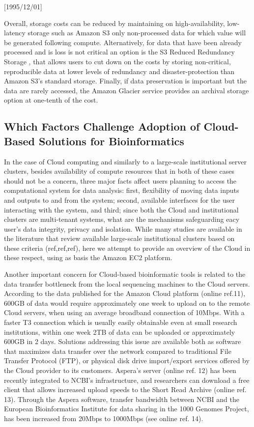 \NeedsTeXFormat{LaTeX2e}[1995/12/01] \documentclass[10pt]{bmc_article}
\newenvironment{bmcformat}{\begin{raggedright}\baselineskip20pt\sloppy\setboolean{publ}{false}}{\end{raggedright}\baselineskip20pt\sloppy}
\begin{document}
\begin{bmcformat}
Overall, storage costs can be reduced by maintaining on high-availability, low-latency storage such as Amazon S3 only non-processed 
data for which value will be generated following compute. Alternatively, for data that have been already processed and is loss is not 
critical an option is the S3 Reduced Redundancy Storage \cite{reduced}, that allows users to cut down on the costs  by storing 
non-critical, reproducible data at lower levels of redundancy and disaster-protection than Amazon S3’s standard storage. Finally, if 
data preservation is important but the data are rarely accessed, the Amazon Glacier service \cite{glacier} provides an archival storage
option at one-tenth of the cost. \pb

\subsection*{Which Factors Challenge Adoption of Cloud-Based Solutions for Bioinformatics }

In the case of Cloud computing and similarly to a large-scale institutional server clusters, besides availability of 
compute resources that in both of these cases should not be a concern, three major facts affect users planning 
to access  the computational system for data analysis: first, flexibility of moving data inputs and outputs to and 
from the system; second, available interfaces for the user interacting with the system, and third; since both the 
Cloud and institutional clusters are multi-tenant systems, what are the mechanisms safeguarding eacy user's data
integrity, privacy and isolation. While many studies are available in the literature that review available large-scale 
institutional clusters based on these criteria (ref,ref,ref), here we attempt to provide an overview of the Cloud
in these respect, using as basis the Amazon EC2 platform.
 
Another important concern for Cloud-based bioinformatic tools is related to the data transfer bottleneck from
the local sequencing machines to the Cloud servers.  According to the data published for the Amazon Cloud
platform (online ref.11), 600GB of data would require approximately one week to upload on to the remote Cloud
servers, when using an average broadband connection of 10Mbps. With a faster T3 connection which is usually
easily obtainable even at small research institutions, within one week 2TB of data can be uploaded or
approximately 600GB in 2 days.  Solutions addressing this issue are available both as software that maximizes
data transfer over the network compared to traditional File Transfer Protocol (FTP), or physical disk drive
import/export services offered by the Cloud provider to its customers. Aspera's server (online ref. 12) has
been recently integrated to NCBI's infrastructure, and researchers can download a free client that allows
increased upload speeds to the Short Read Archive (online ref. 13).  Through the Aspera software, transfer
bandwidth between NCBI and the European Bioinformatics Institute for data sharing in the 1000 Genomes Project,
has been increased from 20Mbps to 1000Mbps (see online ref. 14). 


\end{bmcformat}
\end{document}
